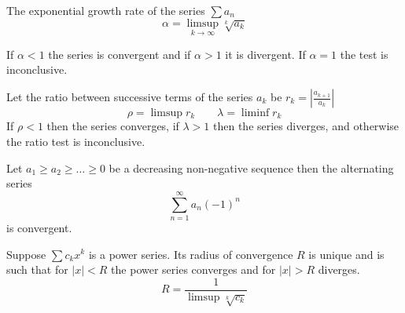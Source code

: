 \begin{definition}
    The exponential growth rate of the series \(\sum{a_n}\)
    \begin{equation*}
        \alpha = \limsup_{k \to \infty}{\sqrt[k]{a_k}}
    \end{equation*}
\end{definition}
\begin{theorem}
    If \(\alpha < 1\) the series is convergent and if \(\alpha > 1\) it is divergent. If \(\alpha = 1\) the test is inconclusive.
\end{theorem}
\begin{theorem}
    Let the ratio between successive terms of the series \(a_k\) be \({r_k = |\frac{a_{k+1}}{a_k}|}\)
    \begin{equation*}
        \rho = \limsup {r_k} \qquad \lambda  = \liminf{r_k}
    \end{equation*}
    If \(\rho < 1\) then the series converges, if \(\lambda > 1\)  then the series diverges, and otherwise the ratio test is inconclusive.
\end{theorem}
\begin{theorem}
    Let \(a_1 \geq a_2 \geq \dots \geq 0\) be a decreasing non-negative sequence then the alternating series
    \begin{equation}
        \sum_{n = 1}^{\infty}{a_n (-1)^n}
    \end{equation}
    is convergent.
\end{theorem}
\begin{theorem}
    Suppose \(\sum{c_k x^k}\) is a power series. Its radius of convergence \(R\) is unique and is such that for \(|x| < R\) the power series converges and for \(|x| > R\) diverges.
    \begin{equation*}
        R = \dfrac{1}{\limsup {\sqrt[k]{c_k}}}
    \end{equation*}
\end{theorem}
